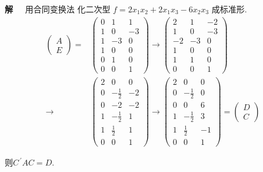 \documentclass[13pt]{beamer}
\def\sol{{\bf 解~~ }}
\begin{document}
\begin{frame}
\sol 用合同变换法 化二次型
$
f=2 x_{1} x_{2}+2 x_{1} x_{3}-6 x_{2} x_{3}
$
成标准形.
\begin{align*}
\left(\begin{array}{c}
A \\
E
\end{array}\right) 
= & 
\left(\begin{array}{ccc}0 & 1 & 1 \\ 1 & 0 & -3 \\ 1 & -3 & 0 \\ 1 & 0 & 0 \\ 0 & 1 & 0 \\ 0 & 0 & 1\end{array}\right) 
\rightarrow
\left(\begin{array}{ccc}2 & 1 & -2 \\ 1 & 0 & -3 \\ -2 & -3 & 0 \\ 1 & 0 & 0 \\ 1 & 1 & 0 \\ 0 & 0 & 1\end{array}\right)\\
\rightarrow & 
\left(\begin{array}{ccc}2 & 0 & 0 \\ 0 & -\frac{1}{2} & -2 \\ 0 & -2 & -2 \\ 1 & -\frac{1}{2} & 1 \\ 1 & \frac{1}{2} & 1 \\ 0 & 0 & 1\end{array}\right)
\rightarrow
\left(\begin{array}{ccc}2 & 0 & 0 \\ 0 & -\frac{1}{2} & 0 \\ 0 & 0 & 6 \\ 1 & -\frac{1}{2} & 3 \\ 1 & \frac{1}{2} & -1 \\ 0 & 0 & 1\end{array}\right)=\left(\begin{array}{c}D \\ C\end{array}\right)
\end{align*}

则$C^{\, \prime} AC = D$.
\end{frame}
\end{document}
